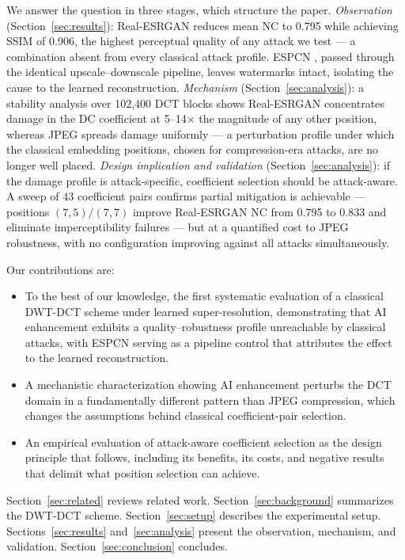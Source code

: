 \documentclass[conference]{IEEEtran}
\begin{document}
We answer the question in three stages, which structure the paper.
\emph{Observation} (Section~\ref{sec:results}): Real-ESRGAN reduces
mean NC to 0.795 while achieving SSIM of 0.906, the highest perceptual
quality of any attack we test --- a combination absent from every
classical attack profile. ESPCN \cite{espcn2016}, passed through the
identical upscale--downscale pipeline, leaves watermarks intact,
isolating the cause to the learned reconstruction.
\emph{Mechanism} (Section~\ref{sec:analysis}): a stability analysis
over 102,400 DCT blocks shows Real-ESRGAN concentrates damage in the
DC coefficient at 5--14$\times$ the magnitude of any other position,
whereas JPEG spreads damage uniformly --- a perturbation profile under
which the classical embedding positions, chosen for compression-era
attacks, are no longer well placed.
\emph{Design implication and validation}
(Section~\ref{sec:analysis}): if the damage profile is
attack-specific, coefficient selection should be attack-aware. A sweep
of 43 coefficient pairs confirms partial mitigation is achievable ---
positions $(7,5)/(7,7)$ improve Real-ESRGAN NC from 0.795 to 0.833 and
eliminate imperceptibility failures --- but at a quantified cost to
JPEG robustness, with no configuration improving against all attacks
simultaneously.

Our contributions are:
\begin{itemize}
\item To the best of our knowledge, the first systematic evaluation of
a classical DWT-DCT scheme under learned super-resolution,
demonstrating that AI enhancement exhibits a quality--robustness
profile unreachable by classical attacks, with ESPCN serving as a
pipeline control that attributes the effect to the learned
reconstruction.
\item A mechanistic characterization showing AI enhancement perturbs
the DCT domain in a fundamentally different pattern than JPEG
compression, which changes the assumptions behind classical
coefficient-pair selection.
\item An empirical evaluation of attack-aware coefficient selection as
the design principle that follows, including its benefits, its costs,
and negative results that delimit what position selection can achieve.
\end{itemize}

Section~\ref{sec:related} reviews related work.
Section~\ref{sec:background} summarizes the DWT-DCT scheme.
Section~\ref{sec:setup} describes the experimental setup.
Sections~\ref{sec:results} and~\ref{sec:analysis} present the
observation, mechanism, and validation. Section~\ref{sec:conclusion}
concludes.
\end{document}
